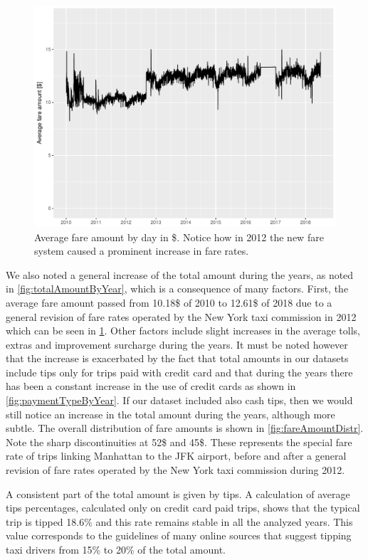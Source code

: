 \documentclass{acm_proc_article-sp-sigmod09}
\begin{document}
\begin{figure}
	\centering
	\includegraphics[width=1\columnwidth]{resources/base_plots/overall_fare_amount.pdf}
	\caption{Average fare amount by day in \$. Notice how in 2012 the new fare system caused a prominent increase in fare rates.}
	\label{fig:overallFareAmount}
\end{figure}

We also noted a general increase of the total amount during the years, as noted in \cref{fig:totalAmountByYear}, which is a consequence of many factors. First, the average fare amount passed from 10.18\$ of 2010 to 12.61\$ of 2018 due to a general revision of fare rates operated by the New York taxi commission in 2012 which can be seen in \cref{fig:overallFareAmount}. Other factors include slight increases in the average tolls, extras and improvement surcharge during the years. It must be noted however that the increase is exacerbated by the fact that total amounts in our datasets include tips only for trips paid with credit card and that during the years there has been a constant increase in the use of credit cards as shown in \cref{fig:paymentTypeByYear}. If our dataset included also cash tips, then we would still notice an increase in the total amount during the years, although more subtle.
The overall distribution of fare amounts is shown in \cref{fig:fareAmountDistr}. Note the sharp discontinuities at 52\$ and 45\$. These represents the special fare rate of trips linking Manhattan to the JFK airport, before and after a general revision of fare rates operated by the New York taxi commission during 2012.

A consistent part of the total amount is given by tips. A calculation of average tips percentages, calculated only on credit card paid trips, shows that the typical trip is tipped 18.6\% and this rate remains stable in all the analyzed years. This value corresponds to the guidelines of many online sources that suggest tipping taxi drivers from 15\% to 20\% of the total amount.
\end{document}
